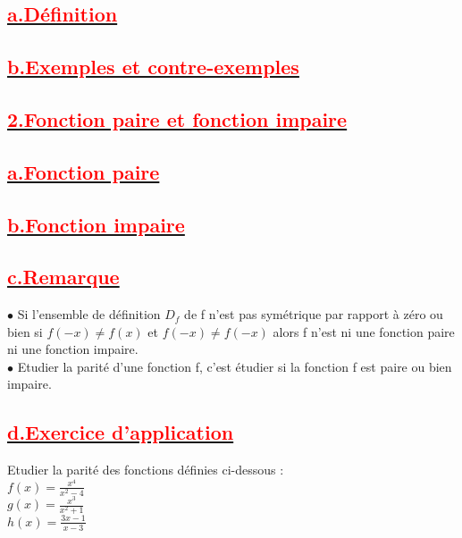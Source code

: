 \documentclass[12pt]{article}
\begin{document}
\subsection*{\underline{\textbf{\textcolor{red}{a.Définition}}}}
\subsection*{\underline{\textbf{\textcolor{red}{b.Exemples et contre-exemples}}}}
\subsection*{\underline{\textbf{\textcolor{red}{2.Fonction paire et fonction impaire}}}}
\subsection*{\underline{\textbf{\textcolor{red}{a.Fonction paire}}}}
\subsection*{\underline{\textbf{\textcolor{red}{b.Fonction impaire}}}}
\subsection*{\underline{\textbf{\textcolor{red}{c.Remarque}}}}
$\bullet$ Si l’ensemble de définition $D_{f}$ de f n’est pas symétrique par rapport à zéro ou bien si \( f(-x) \neq f(x)\) et \(f(-x) \neq f(-x) \) alors f n’est ni une fonction paire ni une fonction impaire.\\
$\bullet$ Etudier la parité d’une fonction f, c’est étudier si la fonction f est paire ou bien impaire.
\subsection*{\underline{\textbf{\textcolor{red}{d.Exercice d’application}}}}
Etudier la parité des fonctions définies ci-dessous :\\
\(f(x)=\frac{x^{4}}{x^{2}-4}\)\\
\(g(x)=\frac{x^{3}}{x^{2}+1}\)\\
\(h(x)=\frac{3x-1}{x-3}\)\\
\end{document}
